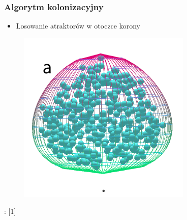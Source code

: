 \documentclass[blue,table]{beamer}
\begin{document}
\begin{frame}\frametitle{Algorytm kolonizacyjny}
\begin{itemize}
\item{Losowanie atraktorów w otoczce korony}
\end{itemize}
\begin{figure}
\includegraphics[scale=0.5]{img/colonization/colonization_1.png} 
\end{figure}
\begin{footnotesize}
: [1]
\end{footnotesize}
\end{frame}
\end{document}
